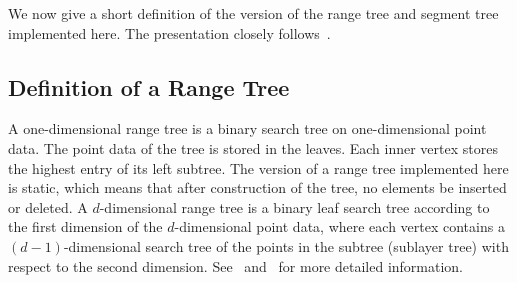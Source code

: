 We now give a short definition of the version of
the range tree and segment tree implemented here. The
presentation closely follows~\cite{bkos-cgaa-97}.

\subsection{Definition of a Range Tree}

A one-dimensional range tree is a binary search tree on one-dimensional 
point data. 
The point data of the tree is stored in the leaves. 
Each inner vertex stores the highest entry of its left subtree.
The version of a range tree implemented here is static, which means that 
after construction of the tree, no elements be inserted or deleted.
A $d$-dimensional range tree is a binary leaf search tree according to the 
first dimension of the $d$-dimensional point data, where each vertex contains 
a $(d-1)$-dimensional search tree of the points in the subtree (sublayer tree)
with respect to the second dimension.
See~\cite{bkos-cgaa-97} and~\cite{s-dasds-90} for more detailed information.

